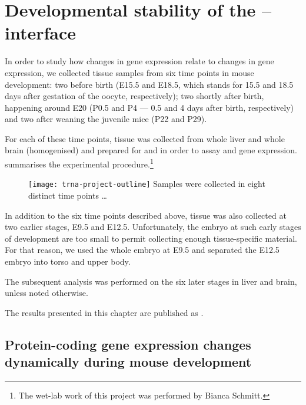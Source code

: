 \chapter{Developmental stability of the \mrna--\trna interface}

In order to study how changes in \mrna gene expression relate to changes in
\trna gene expression, we collected tissue samples from six time points in mouse
development: two before birth (E15.5 and E18.5, which stands for \num{15.5} and
\num{18.5} days after gestation of the oocyte, respectively); two shortly after
birth, happening around E20 (P0.5 and P4 --- \num{0.5} and \num{4} days after
birth, respectively) and two after weaning the juvenile mice (P22 and P29).

For each of these time points, tissue was collected from whole liver and whole
brain (homogenised) and prepared for \rnaseq and  \chipseq in order to
assay \mrna and \trna gene expression. 
summarises the experimental procedure.\footnote{The wet-lab work of this project
was performed by Bianca Schmitt.}

\begin{figure}[h!]
    \centering
    \texttt{[image: trna-project-outline]}
        {Samples were collected in eight distinct time points …}
\end{figure}

In addition to the six time points described above, tissue was also collected at
two earlier stages, E9.5 and E12.5. Unfortunately, the embryo at such early
stages of development are too small to permit collecting enough tissue-specific
material. For that reason, we used the whole embryo at E9.5 and separated the
E12.5 embryo into torso and upper body.

The subsequent analysis was performed on the six later stages in liver and
brain, unless noted otherwise.

The results presented in this chapter are published as \citet{Schmitt:2014}.


\section{Protein-coding gene expression changes dynamically during mouse
development}

